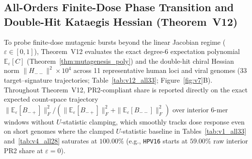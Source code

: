 \documentclass[11pt, a4paper]{article}
\DeclareRobustCommand{\_}{\textunderscore\allowbreak}
\begin{document}
\subsection{All-Orders Finite-Dose Phase Transition and Double-Hit Kataegis Hessian (Theorem~V12)}

To probe finite-dose mutagenic bursts beyond the linear Jacobian regime ($\varepsilon \in [0, 1]$), Theorem~V12 evaluates the exact degree-6 expectation polynomial $\mathbb{E}_\varepsilon[C]$ (Theorem~\ref{thm:mutagenesis_poly}) and the double-hit chiral Hessian norm $\|H_{--}\|^2 \times 10^4$ across 11 representative human loci and viral genomes (33 target--signature trajectories; Table~\ref{tab:v12_all33}; Figure~\ref{fig:v7}B). Throughout Theorem~V12, PR2-compliant share is reported directly on the exact expected count-space trajectory $\|\mathbb{E}_\varepsilon[B_{-+}]\|_F^2 / (\|\mathbb{E}_\varepsilon[B_{-+}]\|_F^2 + \|\mathbb{E}_\varepsilon[B_{--}]\|_F^2)$ over interior 6-mer windows without $U$-statistic clamping, which smoothly tracks dose response even on short genomes where the clamped $U$-statistic baseline in Tables~\ref{tab:v1_all33} and~\ref{tab:v4_all28} saturates at $100.00\%$ (e.g., \texttt{HPV16} starts at $59.00\%$ raw interior PR2 share at $\varepsilon = 0$).
\end{document}
